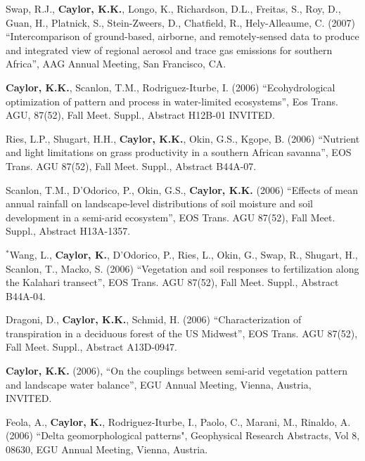 \documentclass[10pt]{report}
\begin{document}
\begin{etaremune}
\item Swap, R.J., \textbf{Caylor, K.K.}, Longo, K., Richardson, D.L., Freitas, S., Roy, D., Guan, H., Platnick,  S., Stein-Zweers, D., Chatfield, R., Hely-Alleaume, C. (2007) ``Intercomparison of ground-based, airborne, and remotely-sensed data to produce and integrated view of regional aerosol and trace gas emissions for southern Africa'', AAG Annual Meeting, San Francisco, CA.

\item \textbf{Caylor, K.K.}, Scanlon, T.M., Rodriguez-Iturbe, I. (2006) ``Ecohydrological optimization of pattern and process in water-limited ecosystems'', Eos Trans. AGU, 87(52), Fall Meet. Suppl., Abstract H12B-01 INVITED.

\item Ries, L.P., Shugart, H.H., \textbf{Caylor, K.K.}, Okin, G.S., Kgope, B. (2006) ``Nutrient and light limitations on grass productivity in a southern African savanna'', EOS Trans. AGU 87(52), Fall Meet. Suppl., Abstract B44A-07.

\item Scanlon, T.M., D'Odorico, P., Okin, G.S., \textbf{Caylor, K.K.} (2006) ``Effects of mean annual rainfall on landscape-level distributions of soil moisture and soil development in a semi-arid ecosystem'', EOS Trans. AGU 87(52), Fall Meet. Suppl., Abstract H13A-1357.

\item $^{*}$Wang, L., \textbf{Caylor, K.}, D'Odorico, P., Ries, L., Okin, G., Swap, R., Shugart, H., Scanlon, T., Macko, S. (2006) ``Vegetation and soil responses to fertilization along the Kalahari transect'', EOS Trans. AGU 87(52), Fall Meet. Suppl., Abstract B44A-04.

\item Dragoni, D., \textbf{Caylor, K.K.}, Schmid, H. (2006) ``Characterization of transpiration in a deciduous forest of the US Midwest'', EOS Trans. AGU 87(52), Fall Meet. Suppl., Abstract A13D-0947.

\item \textbf{Caylor, K.K.} (2006), ``On the couplings between semi-arid vegetation pattern and landscape water balance'', EGU Annual Meeting, Vienna, Austria, INVITED.

\item Feola, A., \textbf{Caylor, K.}, Rodriguez-Iturbe, I., Paolo, C., Marani, M., Rinaldo, A. (2006) ``Delta geomorphological patterns", Geophysical Research Abstracts, Vol 8, 08630, EGU Annual Meeting, Vienna, Austria.


\end{etaremune}
\end{document}
